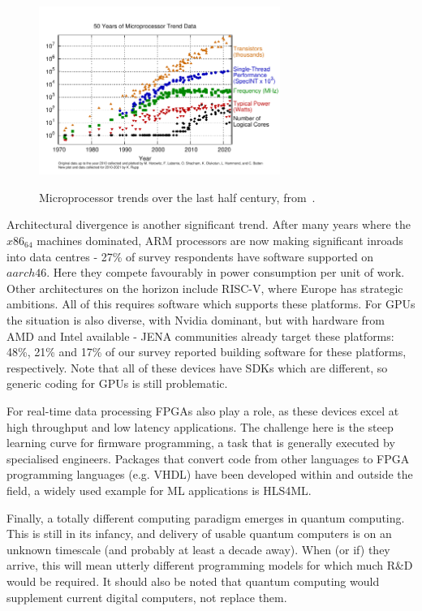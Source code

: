 \begin{figure}[htbp]
\begin{center}
\includegraphics[width=0.7\textwidth]{figures/50-years-processor-trend.pdf} \\ 
\caption{Microprocessor trends over the last half century, from~\cite{KRupp_Microprocessor_Data}.}
\label{figures:Fig5}
\end{center}
\end{figure}


Architectural divergence is another significant trend. After many years where the $x86_64$ machines dominated, ARM processors are now making significant inroads into data centres - 27\% of survey respondents have software supported on $aarch46$. Here they compete favourably in power consumption per unit of work. Other architectures on the horizon include RISC-V, where Europe has strategic ambitions. All of this requires software which supports these platforms. For GPUs the situation is also diverse, with Nvidia dominant, but with hardware from AMD and Intel available - JENA communities already target these platforms: 48\%, 21\% and 17\% of our survey reported building software for these platforms, respectively. Note that all of these devices have SDKs which are different, so generic coding for GPUs is still problematic. 

For real-time data processing FPGAs also play a role, as these devices excel at high throughput and low latency applications. The challenge here is the steep learning curve for firmware programming, a task that is generally executed by specialised engineers. Packages that convert code from other languages to FPGA programming languages (e.g. VHDL) have been developed within and outside the field, a widely used example for ML applications is HLS4ML.

Finally, a totally different computing paradigm emerges in quantum computing. This is still in its infancy, and delivery of usable quantum computers is on an unknown timescale (and probably at least a decade away). When (or if) they arrive, this will mean utterly different programming models for which much R\&D would be required. It should also be noted that quantum computing would supplement current digital computers, not replace them.


